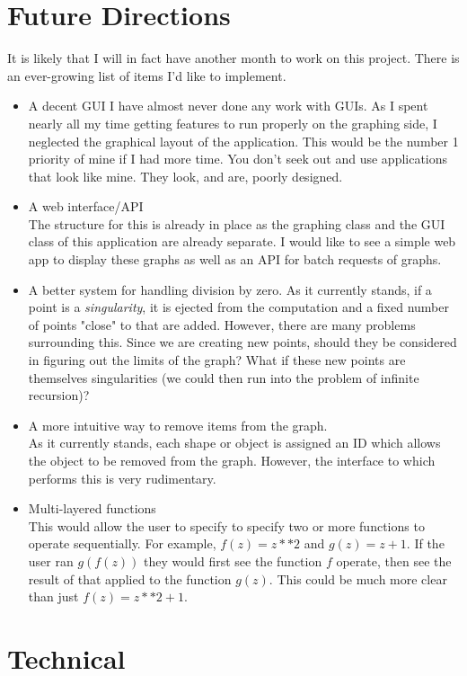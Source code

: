 \documentclass{article}
\begin{document}
\section{Future Directions}
    It is likely that I will in fact have another month to work on this project. There is an ever-growing list of items I'd like to implement.
    \begin{itemize}
        \item A decent GUI
            I have almost never done any work with GUIs. As I spent nearly all my time getting features to run properly on the graphing side, I neglected the graphical layout of the application. This would be the number 1 priority of mine if I had more time. You don't seek out and use applications that look like mine. They look, and are, poorly designed.
        \item A web interface/API\\
            The structure for this is already in place as the graphing class and the GUI class of this application are already separate. I would like to see a simple web app to display these graphs as well as an API for batch requests of graphs.
        \item A better system for handling division by zero.
            As it currently stands, if a point is a \textit{singularity}, it is ejected from the computation and a fixed number of points "close" to that are added. However, there are many problems surrounding this. Since we are creating new points, should they be considered in figuring out the limits of the graph? What if these new points are themselves singularities (we could then run into the problem of infinite recursion)?
        \item A more intuitive way to remove items from the graph.\\
            As it currently stands, each shape or object is assigned an ID which allows the object to be removed from the graph. However, the interface to which performs this is very rudimentary.
        \item Multi-layered functions\\
            This would allow the user to specify to specify two or more functions to operate sequentially. For example, $f(z) = z**2$ and $g(z) = z + 1$. If the user ran $g(f(z))$ they would first see the function $f$ operate, then see the result of that applied to the function $g(z)$. This could be much more clear than just $f(z) = z**2 + 1$.
    \end{itemize}
\section{Technical}
\end{document}

